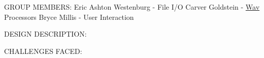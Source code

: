 G\+R\+O\+UP M\+E\+M\+B\+E\+RS\+: Eric Ashton Westenburg -\/ File I/O Carver Goldstein -\/ \hyperlink{classWav}{Wav} Processors Bryce Millis -\/ User Interaction

D\+E\+S\+I\+GN D\+E\+S\+C\+R\+I\+P\+T\+I\+ON\+:

C\+H\+A\+L\+L\+E\+N\+G\+ES F\+A\+C\+ED\+: 